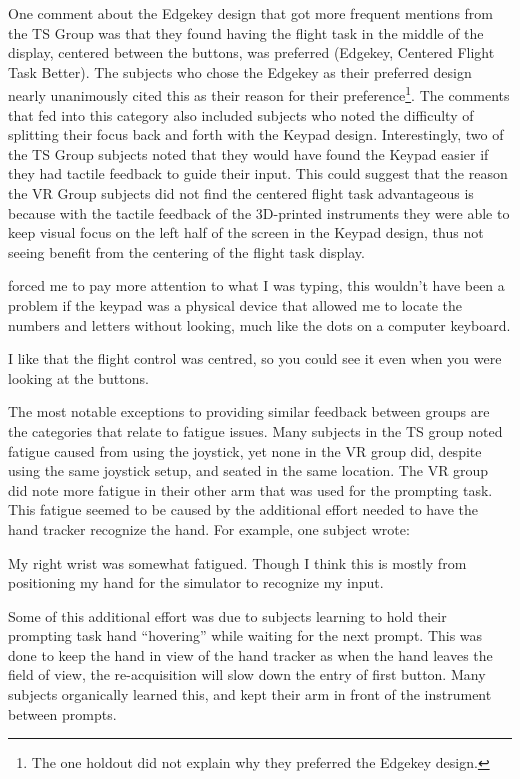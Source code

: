 One comment about the Edgekey design that got more frequent mentions from the TS Group was that they found having the flight task in the middle of the display, centered between the buttons, was preferred (Edgekey, Centered Flight Task Better).
The subjects who chose the Edgekey as their preferred design nearly unanimously cited this as their reason for their preference\footnote{The one holdout did not explain why they preferred the Edgekey design.}.
The comments that fed into this category also included subjects who noted the difficulty of splitting their focus back and forth with the Keypad design.
Interestingly, two of the TS Group subjects noted that they would have found the Keypad easier if they had tactile feedback to guide their input.
This could suggest that the reason the VR Group subjects did not find the centered flight task advantageous is because with the tactile feedback of the 3D-printed instruments they were able to keep visual focus on the left half of the screen in the Keypad design, thus not seeing benefit from the centering of the flight task display.
\begin{displayquote}[TS Subject]
     forced me to pay more attention to what I was typing, this wouldn't have been a problem if the keypad was a physical device that allowed me to locate the numbers and letters without looking, much like the dots on a computer keyboard.
\end{displayquote}
\begin{displayquote}[VR Subject]
    I like that the flight control was cent\textins[e]red, so you could see it even when you were looking at the buttons.
\end{displayquote}

The most notable exceptions to providing similar feedback between groups are the categories that relate to fatigue issues.
Many subjects in the TS group noted fatigue caused from using the joystick, yet none in the VR group did, despite using the same joystick setup, and seated in the same location.
The VR group did note more fatigue in their other arm that was used for the prompting task.
This fatigue seemed to be caused by the additional effort needed to have the hand tracker recognize the hand.
For example, one subject wrote:
\begin{displayquote}[VR Subject]
    My right wrist was somewhat fatigued.  Though I think this is mostly from positioning my hand for the simulator to recognize my input.
\end{displayquote}
Some of this additional effort was due to subjects learning to hold their prompting task hand ``hovering'' while waiting for the next prompt.
This was done to keep the hand in view of the hand tracker as when the hand leaves the field of view, the re-acquisition will slow down the entry of first button.
Many subjects organically learned this, and kept their arm in front of the instrument between prompts.

